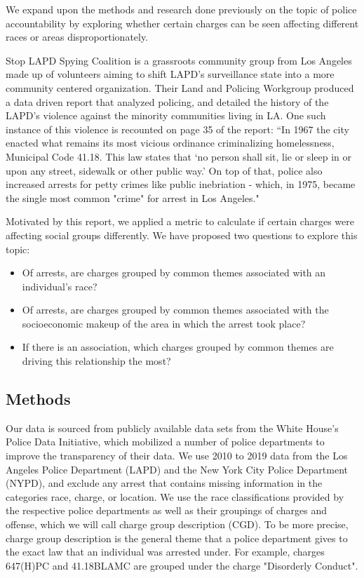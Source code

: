 \documentclass{article}
\begin{document}
We expand upon the methods and research done previously on the topic of police accountability by exploring whether certain charges can be seen affecting different races or areas disproportionately. 

Stop LAPD Spying Coalition is a grassroots community group from Los Angeles made up of volunteers aiming to shift LAPD's surveillance state into a more community centered organization. Their Land and Policing Workgroup produced a data driven report that analyzed policing, and detailed the history of the LAPD's violence against the minority communities living in LA. One such instance of this violence is recounted on page 35 of the report: ``In 1967 the city enacted
what remains its most vicious ordinance criminalizing homelessness, Municipal Code
41.18. This law states that `no person shall sit, lie or sleep in or upon any street,
sidewalk or other public way.' On top of that, police also increased arrests for petty
crimes like public inebriation - which, in 1975, became the single most common "crime" for arrest in Los Angeles."\cite{auto-banish} 

Motivated by this report, we applied a metric to calculate if certain charges were affecting social groups differently.
We have proposed two questions to explore this topic: 

\begin{itemize}
    \item Of arrests, are charges grouped by common themes associated with an individual’s race?
    \item Of arrests, are charges grouped by common themes associated with the socioeconomic makeup of the area in which the arrest took place? 
    \item If there is an association, which charges grouped by common themes are driving this relationship the most?
\end{itemize}

\subsection{Methods}
Our data is sourced from publicly available data sets from the White House's Police Data Initiative, which mobilized a number of police departments to improve the transparency of their data.\cite{white-house-police-data-initiative}\cite{LAPD-PDI}\cite{NYPD-PDI} We use 2010 to 2019 data from the Los Angeles Police Department (LAPD) and the New York City Police Department (NYPD), and exclude any arrest that contains missing information in the categories race, charge, or location. We use the race classifications provided by the respective police departments as well as their groupings of charges and offense, which we will call charge group description (CGD). To be more precise, charge group description is the general theme that a police department gives to the exact law that an individual was arrested under. For example, charges 647(H)PC and 41.18BLAMC are grouped under the charge "Disorderly Conduct".
\end{document}

